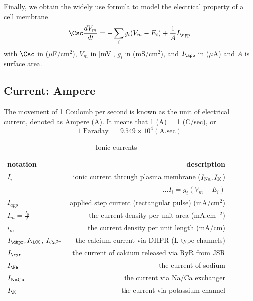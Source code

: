 Finally, we obtain the widely use formula to model the electrical
property of a cell membrane
  \begin{equation}
    \label{eq:33}
    \Csc \frac{dV_m}{dt} = -\sum_i g_i (V_m-E_i) + \frac{1}{A} I_\app %
  \end{equation}
with $\Csc$ in ($\mu$F/cm$^2$), $V_m$ in [mV], $g_i$ in (mS/cm$^2$),
and $I_\app$ in ($\mu$A) and $A$ is surface area. 

\subsection{Current: Ampere}
\label{sec:ampere-current}
\label{sec:current-ampere}
The movement of 1 Coulomb per second is known as the unit of
electrical current, denoted as Ampere (A). It means that 1 (A) = 1
(C/sec), or
\begin{equation}
  \label{eq:1345}
  1 \text{ Faraday } = 9.649\times 10^4 (\text{A.sec})
\end{equation}


\begin{table}[hbt]
  \begin{center}
    \caption{Ionic currents}
    \begin{tabular}{p{2cm}r} 
      \hline
      notation & description \\ 
      \hline\hline
      $I_i$ & ionic current through plasma membrane ($I_{\ce{Na}},
      I_{\ce{K}}$) \\
      & ...$I_i = g_i(V_m-E_i) $ \\
      $I_{app}$ & applied step current (rectangular pulse) (mA/cm$^2$)\\
      $I_m=\frac{I_0}{A}$ & the current density per unit area (mA.cm$^{-2}$) \\
      $i_m$ & the current density per unit length (mA/cm) \\
      $I_\dhpr, I_\LCC$,  $I_{\text{Ca}^{2+}}$       & the calcium current via DHPR (L-type channels) \\
      $I_\ryr$ & the current of calcium released via RyR from JSR \\
      $I_\Na$ & the current of sodium \\
      $I_{\text{NaCa}}$ & the current via Na/Ca exchanger \\
      $I_\K$ & the current via potassium channel \\
    \end{tabular}
  \end{center}
  \label{tab:Current}
\end{table}

